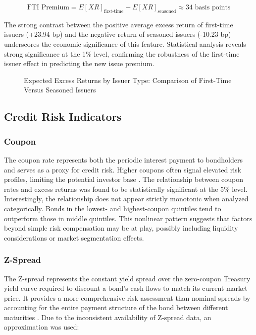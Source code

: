 $$\text{FTI Premium} = E[XR]_{\text{first-time}} - E[XR]_{\text{seasoned}} \approx 34 \text{ basis points}$$

The strong contrast between the positive average excess return of first-time issuers (+23.94 bp) and the negative return of seasoned issuers (-10.23 bp) underscores the economic significance of this feature. Statistical analysis reveals strong significance at the 1\% level, confirming the robustness of the first-time issuer effect in predicting the new issue premium.

\begin{figure}[h]
    \begin{center}
        
    \end{center}
    \caption{Expected Excess Returns by Issuer Type: Comparison of First-Time Versus Seasoned Issuers}
    \label{fig:fti}
\end{figure}

\subsection{Credit Risk Indicators}

\subsubsection{Coupon}
The coupon rate represents both the periodic interest payment to bondholders and serves as a proxy for credit risk. Higher coupons often signal elevated risk profiles, limiting the potential investor base \parencite{Geerts2022PredictingYield}. The relationship between coupon rates and excess returns was found to be statistically significant at the 5\% level. Interestingly, the relationship does not appear strictly monotonic when analyzed categorically. Bonds in the lowest- and highest-coupon quintiles tend to outperform those in middle quintiles. This nonlinear pattern suggests that factors beyond simple risk compensation may be at play, possibly including liquidity considerations or market segmentation effects.

\subsubsection{Z-Spread}
The Z-spread represents the constant yield spread over the zero-coupon Treasury yield curve required to discount a bond's cash flows to match its current market price. It provides a more comprehensive risk assessment than nominal spreads by accounting for the entire payment structure of the bond between different maturities \parencite[pp. 816 - 818]{Fabozzi2021TheEdition}. Due to the inconsistent availability of Z-spread data, an approximation was used:

